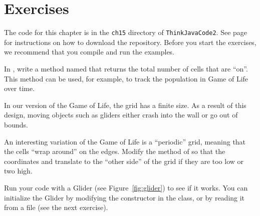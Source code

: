 \section{Exercises}

The code for this chapter is in the {\tt ch15} directory of {\tt ThinkJavaCode2}.
See page~\pageref{code} for instructions on how to download the repository.
Before you start the exercises, we recommend that you compile and run the examples.


\begin{exercise}
In , write a method named  that returns the total number of cells that are ``on''.
This method can be used, for example, to track the population in Game of Life over time.
\end{exercise}


\begin{exercise}
In our version of the Game of Life, the grid has a finite size.
As a result of this design, moving objects such as gliders either crash into the wall or go out of bounds.

An interesting variation of the Game of Life is a ``periodic'' grid, meaning that the cells ``wrap around'' on the edges.
Modify the  method of  so that the coordinates  and  translate to the ``other side'' of the grid if they are too low or two high.

Run your code with a Glider (see Figure~\ref{fig:glider}) to see if it works.
You can initialize the Glider by modifying the constructor in the  class, or by reading it from a file (see the next exercise).
\end{exercise}





